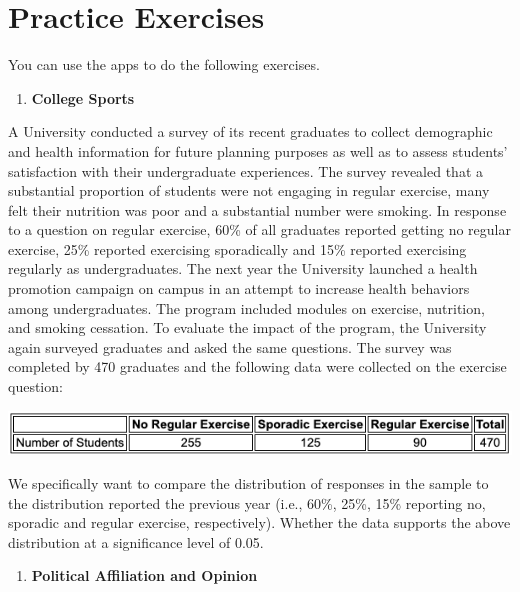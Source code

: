 \documentclass[
]{book}
\providecommand{\tightlist}{%
  \setlength{\itemsep}{0pt}\setlength{\parskip}{0pt}}
\begin{document}
\hfill\break

\hypertarget{practice-exercises-6}{%
\section{Practice Exercises}\label{practice-exercises-6}}

\hfill\break
\hfill\break
You can use the apps to do the following exercises.

\begin{enumerate}
\def\labelenumi{\arabic{enumi}.}
\tightlist
\item
  \textbf{College Sports}
\end{enumerate}

A University conducted a survey of its recent graduates to collect demographic and health information for future planning purposes as well as to assess students' satisfaction with their undergraduate experiences. The survey revealed that a substantial proportion of students were not engaging in regular exercise, many felt their nutrition was poor and a substantial number were smoking. In response to a question on regular exercise, 60\% of all graduates reported getting no regular exercise, 25\% reported exercising sporadically and 15\% reported exercising regularly as undergraduates. The next year the University launched a health promotion campaign on campus in an attempt to increase health behaviors among undergraduates. The program included modules on exercise, nutrition, and smoking cessation. To evaluate the impact of the program, the University again surveyed graduates and asked the same questions. The survey was completed by 470 graduates and the following data were collected on the exercise question:

\begin{center}\includegraphics[width=0.75\linewidth]{week13/practiceEx01Data} \end{center}

We specifically want to compare the distribution of responses in the sample to the distribution reported the previous year (i.e., 60\%, 25\%, 15\% reporting no, sporadic and regular exercise, respectively). Whether the data supports the above distribution at a significance level of 0.05.

\begin{enumerate}
\def\labelenumi{\arabic{enumi}.}
\setcounter{enumi}{1}
\tightlist
\item
  \textbf{Political Affiliation and Opinion}
\end{enumerate}
\end{document}
